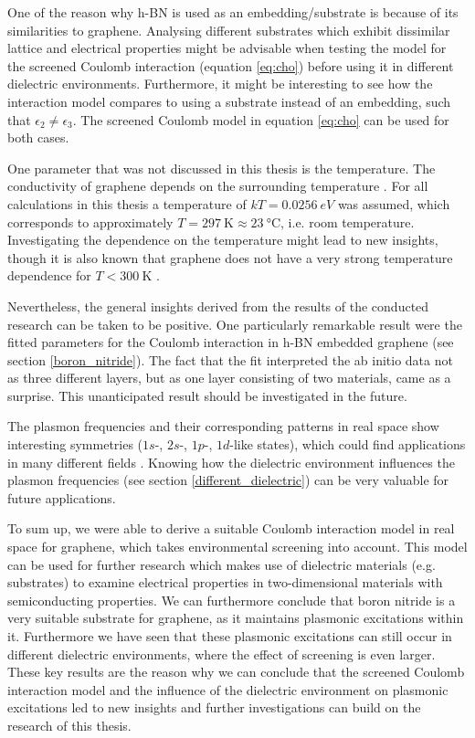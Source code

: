One of the reason why h-BN is used as an embedding/substrate is because of its similarities to graphene. Analysing different substrates which exhibit dissimilar lattice and electrical properties might be advisable when testing the model for the screened Coulomb interaction (equation \ref{eq:cho}) before using it in different dielectric environments. Furthermore, it might be interesting to see how the interaction model compares to using a substrate instead of an embedding, such that $\epsilon_2\neq\epsilon_3$. The screened Coulomb model in equation \ref{eq:cho} can be used for both cases.\medskip

One parameter that was not discussed in this thesis is the temperature. The conductivity of graphene depends on the surrounding temperature \cite{Sarma2011}. For all calculations in this thesis a temperature of $kT =\SI{0.0256}{eV}$ was assumed, which corresponds to approximately $T=\SI{297}{\kelvin}\approx \SI{23}{\celsius}$, i.e. room temperature. Investigating the dependence on the temperature might lead to new insights, though it is also known that graphene does not have a very strong temperature dependence for $T<\SI{300}{\kelvin}$ \cite{Sarma2011}.\medskip

Nevertheless, the general insights derived from the results of the conducted research can be taken to be positive. One particularly remarkable result were the fitted parameters for the Coulomb interaction in h-BN embedded graphene (see section \ref{boron_nitride}). The fact that the fit interpreted the ab initio data not as three different layers, but as one layer consisting of two materials, came as a surprise. This unanticipated result should be investigated in the future.\medskip

The plasmon frequencies and their corresponding patterns in real space show interesting symmetries ($1s$-, $2s$-, $1p$-, $1d$-like states), which could find applications in many different fields \cite{Bao2017}. Knowing how the dielectric environment influences the plasmon frequencies (see section \ref{different_dielectric}) can be very valuable for future applications.\medskip

To sum up, we were able to derive a suitable Coulomb interaction model in real space for graphene, which takes environmental screening into account. This model can be used for further research which makes use of dielectric materials (e.g. substrates) to examine electrical properties in two-dimensional materials with semiconducting properties. We can furthermore conclude that boron nitride is a very suitable substrate for graphene, as it maintains plasmonic excitations within it. Furthermore we have seen that these plasmonic excitations can still occur in different dielectric environments, where the effect of screening is even larger. These key results are the reason why we can conclude that the screened Coulomb interaction model and the influence of the dielectric environment on plasmonic excitations led to new insights and further investigations can build on the research of this thesis.